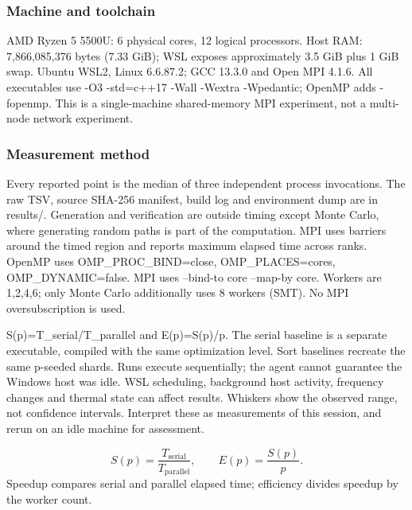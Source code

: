 \documentclass[11pt,a4paper]{article}
\begin{document}
\subsubsection*{Machine and toolchain}

AMD Ryzen 5 5500U: 6 physical cores, 12 logical processors. Host RAM: 7,866,085,376 bytes (7.33 GiB); WSL exposes approximately 3.5 GiB plus 1 GiB swap. Ubuntu WSL2, Linux 6.6.87.2; GCC 13.3.0 and Open MPI 4.1.6. All executables use -O3 -std=\allowbreak{}c++17 -Wall -Wextra -Wpedantic; OpenMP adds -fopenmp. This is a single-machine shared-memory MPI experiment, not a multi-node network experiment.


\subsubsection*{Measurement method}

Every reported point is the median of three independent process invocations. The raw TSV, source SHA-256 manifest, build log and environment dump are in results/\allowbreak{}. Generation and verification are outside timing except Monte Carlo, where generating random paths is part of the computation. MPI uses barriers around the timed region and reports maximum elapsed time across ranks. OpenMP uses OMP\_\allowbreak{}PROC\_\allowbreak{}BIND=\allowbreak{}close, OMP\_\allowbreak{}PLACES=\allowbreak{}cores, OMP\_\allowbreak{}DYNAMIC=\allowbreak{}false. MPI uses --bind-to core --map-by core. Workers are 1,2,4,6; only Monte Carlo additionally uses 8 workers (SMT). No MPI oversubscription is used.


S(p)=\allowbreak{}T\_\allowbreak{}serial/\allowbreak{}T\_\allowbreak{}parallel and E(p)=\allowbreak{}S(p)/\allowbreak{}p. The serial baseline is a separate executable, compiled with the same optimization level. Sort baselines recreate the same p-seeded shards. Runs execute sequentially; the agent cannot guarantee the Windows host was idle. WSL scheduling, background host activity, frequency changes and thermal state can affect results. Whiskers show the observed range, not confidence intervals. Interpret these as measurements of this session, and rerun on an idle machine for assessment.


\[S(p)=\frac{T_{\mathrm{serial}}}{T_{\mathrm{parallel}}},\qquad E(p)=\frac{S(p)}{p}.\] Speedup compares serial and parallel elapsed time; efficiency divides speedup by the worker count.
\end{document}
